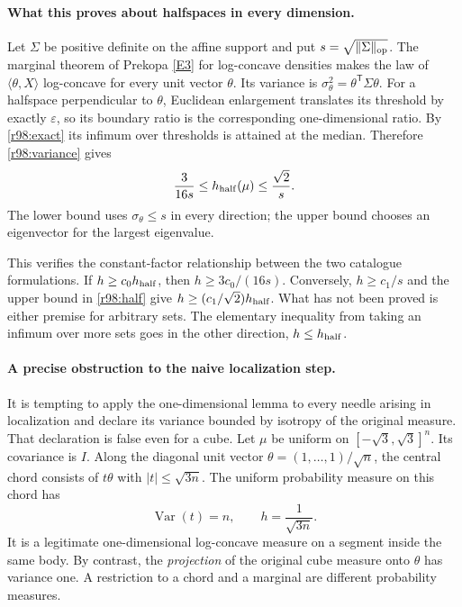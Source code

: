 \documentclass[11pt]{article}
\begin{document}
\paragraph{What this proves about halfspaces in every dimension.}
Let $\Sigma$ be positive definite on the affine support and put
$s=\sqrt{\|\Sigma\|_{\rm op}}$. The marginal theorem of Prekopa
\href{https://acta.bibl.u-szeged.hu/14411/1/math_034_335-343.pdf}{[E3]} for
log-concave densities makes the law of $\langle\theta,X\rangle$
log-concave for every unit vector $\theta$. Its variance is
$\sigma_\theta^2=\theta^{\mathsf T}\Sigma\theta$.
For a halfspace perpendicular to $\theta$, Euclidean enlargement
translates its threshold by exactly $\varepsilon$, so its boundary
ratio is the corresponding one-dimensional ratio. By
\eqref{r98:exact} its infimum over thresholds is attained at the
median. Therefore \eqref{r98:variance} gives
\begin{equation}\label{r98:half}
              \frac3{16s}\le h_{\rm half}(\mu)\le\frac{\sqrt2}{s}.
\end{equation}
The lower bound uses $\sigma_\theta\le s$ in every direction; the
upper bound chooses an eigenvector for the largest eigenvalue.

This verifies the constant-factor relationship between the two
catalogue formulations. If $h\ge c_0h_{\rm half}$, then
$h\ge3c_0/(16s)$. Conversely, $h\ge c_1/s$ and the upper bound in
\eqref{r98:half} give $h\ge(c_1/\sqrt2)h_{\rm half}$. What has not
been proved is either premise for arbitrary sets. The elementary
inequality from taking an infimum over more sets goes in the other
direction, $h\le h_{\rm half}$.

\paragraph{A precise obstruction to the naive localization step.}
It is tempting to apply the one-dimensional lemma to every needle
arising in localization and declare its variance bounded by isotropy
of the original measure. That declaration is false even for a cube.
Let $\mu$ be uniform on $[-\sqrt3,\sqrt3]^n$. Its covariance is $I$.
Along the diagonal unit vector $\theta=(1,\ldots,1)/\sqrt n$, the
central chord consists of $t\theta$ with
$|t|\le\sqrt{3n}$. The uniform probability measure on this chord
has
\[
          \operatorname{Var}(t)=n,\qquad
                             h=\frac1{\sqrt{3n}}.
\]
It is a legitimate one-dimensional log-concave measure on a segment
inside the same body. By contrast, the \emph{projection} of the
original cube measure onto $\theta$ has variance one. A restriction
to a chord and a marginal are different probability measures.
\end{document}
